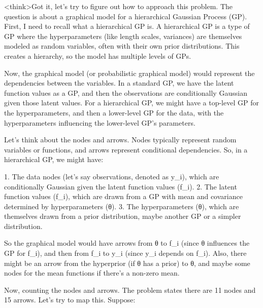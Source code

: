 <think>Got it, let's try to figure out how to approach this problem. The question is about a graphical model for a hierarchical Gaussian Process (GP). First, I need to recall what a hierarchical GP is. A hierarchical GP is a type of GP where the hyperparameters (like length scales, variances) are themselves modeled as random variables, often with their own prior distributions. This creates a hierarchy, so the model has multiple levels of GPs.

Now, the graphical model (or probabilistic graphical model) would represent the dependencies between the variables. In a standard GP, we have the latent function values as a GP, and then the observations are conditionally Gaussian given those latent values. For a hierarchical GP, we might have a top-level GP for the hyperparameters, and then a lower-level GP for the data, with the hyperparameters influencing the lower-level GP's parameters.

Let's think about the nodes and arrows. Nodes typically represent random variables or functions, and arrows represent conditional dependencies. So, in a hierarchical GP, we might have:

1. The data nodes (let's say observations, denoted as y_i), which are conditionally Gaussian given the latent function values (f_i).
2. The latent function values (f_i), which are drawn from a GP with mean and covariance determined by hyperparameters (θ).
3. The hyperparameters (θ), which are themselves drawn from a prior distribution, maybe another GP or a simpler distribution.

So the graphical model would have arrows from θ to f_i (since θ influences the GP for f_i), and then from f_i to y_i (since y_i depends on f_i). Also, there might be an arrow from the hyperprior (if θ has a prior) to θ, and maybe some nodes for the mean functions if there's a non-zero mean.

Now, counting the nodes and arrows. The problem states there are 11 nodes and 15 arrows. Let's try to map this. Suppose:

